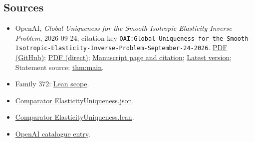 \documentclass[11pt]{article}
\begin{document}
\subsection{Sources}
\begin{itemize}
\item OpenAI, \emph{Global Uniqueness for the Smooth Isotropic Elasticity Inverse Problem}, 2026-09-24; citation key \texttt{OAI:Global-Uniqueness-for-the-Smooth-Isotropic-Elasticity-Inverse-Problem-September-24-2026}. \href{https://github.com/openai/math/blob/adc7f1241b42e322a6451854ab7e4b4c146bf78a/preprints/Global-Uniqueness-for-the-Smooth-Isotropic-Elasticity-Inverse-Problem-September-24-2026/article.pdf}{PDF (GitHub)}; \href{https://github.com/openai/math/raw/adc7f1241b42e322a6451854ab7e4b4c146bf78a/preprints/Global-Uniqueness-for-the-Smooth-Isotropic-Elasticity-Inverse-Problem-September-24-2026/article.pdf}{PDF (direct)}; \href{https://github.com/openai/math/blob/adc7f1241b42e322a6451854ab7e4b4c146bf78a/preprints/Global-Uniqueness-for-the-Smooth-Isotropic-Elasticity-Inverse-Problem-September-24-2026/README.md}{Manuscript page and citation}; \href{https://github.com/openai/math/blob/main/preprints/Global-Uniqueness-for-the-Smooth-Isotropic-Elasticity-Inverse-Problem-September-24-2026/article.pdf}{Latest version}; Statement source: \href{https://github.com/openai/math/blob/adc7f1241b42e322a6451854ab7e4b4c146bf78a/preprints/Global-Uniqueness-for-the-Smooth-Isotropic-Elasticity-Inverse-Problem-September-24-2026/build/sections/introduction.tex\#L31}{thm:main}.
\item Family 372: \href{https://github.com/openai/math/blob/adc7f1241b42e322a6451854ab7e4b4c146bf78a/lean/docs/372.md}{Lean scope}.
\item \href{https://github.com/openai/math/blob/adc7f1241b42e322a6451854ab7e4b4c146bf78a/lean/ComparatorChallenges/ElasticityUniqueness.json}{Comparator ElasticityUniqueness.json}.
\item \href{https://github.com/openai/math/blob/adc7f1241b42e322a6451854ab7e4b4c146bf78a/lean/ComparatorChallenges/ElasticityUniqueness.lean}{Comparator ElasticityUniqueness.lean}.
\item \href{https://github.com/openai/math/blob/adc7f1241b42e322a6451854ab7e4b4c146bf78a/CONTENTS.md}{OpenAI catalogue entry}.
\end{itemize}
\end{document}
